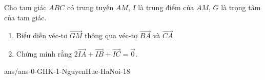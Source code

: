 \begin{ex}%
Cho tam giác $ABC$ có trung tuyến $AM$, $I$ là trung điểm của $AM$, $G$ là trọng tâm của tam giác.
\begin{enumerate}
\item Biểu diễn véc-tơ $\overrightarrow{GM}$ thông qua véc-tơ $\overrightarrow{BA}$ và $\overrightarrow{CA}$.
\item Chứng minh rằng $2\overrightarrow{IA} + \overrightarrow{IB} + \overrightarrow{IC} = \overrightarrow{0}$.
\end{enumerate}
\end{ex}




\begin{indapan}{10}
	{ans/ans-0-GHK-1-NguyenHue-HaNoi-18}
\end{indapan}
